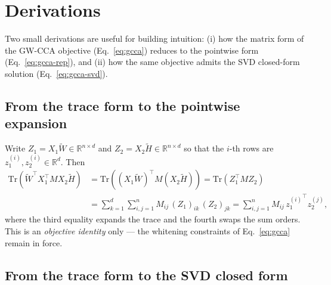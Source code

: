 \documentclass{article}
\begin{document}
\section{Derivations}
\label{app:derivations}

Two small derivations are useful for building intuition: (i) how the
matrix form of the GW-CCA objective (Eq.~\ref{eq:gcca}) reduces to the
pointwise form (Eq.~\ref{eq:gcca-rep}), and (ii) how the same objective
admits the SVD closed-form solution (Eq.~\ref{eq:gcca-svd}).

\subsection*{From the trace form to the pointwise expansion}
\label{app:derivations:pointwise}

Write $Z_1 = X_1 \widetilde{W} \in \mathbb{R}^{n \times d}$ and
$Z_2 = X_2 \widetilde{H} \in \mathbb{R}^{n \times d}$ so that the $i$-th
rows are $z_1^{(i)}, z_2^{(i)} \in \mathbb{R}^d$. Then
\begin{align*}
\mathrm{Tr}\!\left(\widetilde{W}^\top X_1^\top M X_2 \widetilde{H}\right)
&= \mathrm{Tr}\!\left((X_1 \widetilde{W})^\top M (X_2 \widetilde{H})\right)
 = \mathrm{Tr}(Z_1^\top M Z_2) \\
&= \sum_{k=1}^{d} \sum_{i,j=1}^{n} M_{ij}\, (Z_1)_{ik}\, (Z_2)_{jk}
 = \sum_{i,j=1}^{n} M_{ij}\, {z_1^{(i)}}^\top z_2^{(j)},
\end{align*}
where the third equality expands the trace and the fourth swaps the sum
orders. This is an \emph{objective identity} only --- the whitening
constraints of Eq.~\ref{eq:gcca} remain in force.

\subsection*{From the trace form to the SVD closed form}
\label{app:derivations:svd}
\end{document}
